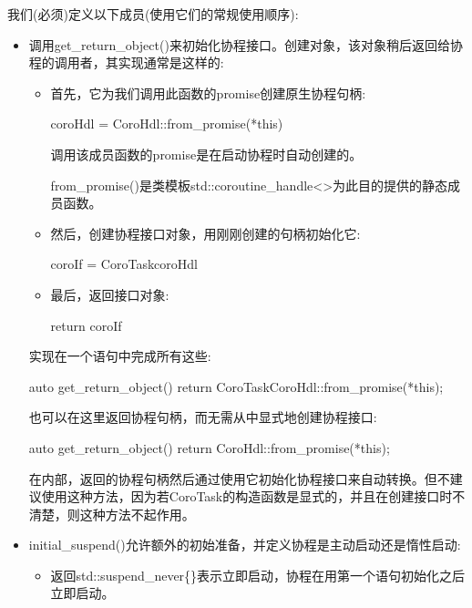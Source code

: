 我们(必须)定义以下成员(使用它们的常规使用顺序):

\begin{itemize}
\item 
调用get\_return\_object()来初始化协程接口。创建对象，该对象稍后返回给协程的调用者，其实现通常是这样的:
\begin{itemize}
\item 
首先，它为我们调用此函数的promise创建原生协程句柄:

\begin{cpp}
coroHdl = CoroHdl::from_promise(*this)
\end{cpp}

调用该成员函数的promise是在启动协程时自动创建的。

from\_promise()是类模板std::coroutine\_handle<>为此目的提供的静态成员函数。

\item 
然后，创建协程接口对象，用刚刚创建的句柄初始化它:

\begin{cpp}
coroIf = CoroTask{coroHdl}
\end{cpp}


\item 
最后，返回接口对象:

\begin{cpp}
return coroIf
\end{cpp}

\end{itemize}

实现在一个语句中完成所有这些:

\begin{cpp}
auto get_return_object() {
	return CoroTask{CoroHdl::from_promise(*this)};
}
\end{cpp}

也可以在这里返回协程句柄，而无需从中显式地创建协程接口:

\begin{cpp}
auto get_return_object() {
	return CoroHdl::from_promise(*this);
}
\end{cpp}

在内部，返回的协程句柄然后通过使用它初始化协程接口来自动转换。但不建议使用这种方法，因为若CoroTask的构造函数是显式的，并且在创建接口时不清楚，则这种方法不起作用。

\item 
initial\_suspend()允许额外的初始准备，并定义协程是主动启动还是惰性启动:

\begin{itemize}
\item 
返回std::suspend\_never\{\}表示立即启动，协程在用第一个语句初始化之后立即启动。


\end{itemize}
\end{itemize}
